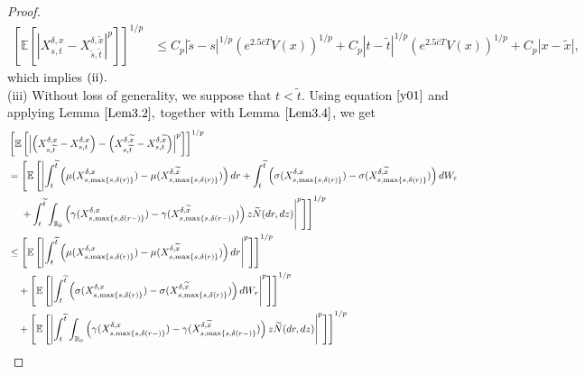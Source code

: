 \documentclass[11pt]{article}
\theoremstyle{theorem}
\theoremstyle{definition}
\newcommand{\bR}{\mathbb{R}}
\newcommand{\1}{{\bf 1}}
\begin{document}
\begin{proof}
\begin{align*}
\left[\mathbb{E}\left[\left|X^{\delta, x}_{s,t}-X^{\delta, \widetilde{x}}_{\widetilde{s}, \widetilde{t}}\right|^p\right]\right]^{1/p} 
& \leq 
 C_p |\widetilde{s} -s|^{1/p} (e^{2.5\overline{c}T}V(x))^{1/p}  + C_p | t -  \widetilde{t} |^{1/p}  (e^{2.5\overline{c}T}V(x))^{1/p}   + C_p |x-\widetilde{x}|,
\end{align*}
which implies $\textup{(ii)}.$\\
(iii) 
Without loss of generality, we suppose that $t<\widetilde{t}.$ Using equation $\eqref{y01}$ and applying Lemma $\ref{Lem3.2},$ together with Lemma $\ref{Lem3.4}$, we get
\begin{align*}
   & \left[\mathbb{E}\left[\left|\left(X^{\delta, x}_{s,\widetilde{t}}-X^{\delta,x}_{s,t}\right) - \left(X^{\delta, \widetilde{x}}_{s,\widetilde{t}}-X^{\delta, \widetilde{x}}_{s,t}\right)\right|^p\right]\right]^{1/p} \notag\\
  & =  \left[\mathbb{E} \left[\left| \int_t^{\widetilde{t} } \left ( \mu(X_{s,\max\{s,\delta(r)\}}^{\delta,x}) -\mu(X_{s,\max\{s,\delta(r)\}}^{\delta,\widetilde{x}}) \right) dr + \int_t^{\widetilde{t}} \left ( \sigma(X_{s,\max\{s,\delta(r)\}}^{\delta,x}) -\sigma(X_{s,\max\{s,\delta(r)\}}^{\delta,\widetilde{x}}) \right) dW_r \right. \right. \right.  \notag\\
  & \quad  \left. \left. \left. + \int_t^{\widetilde{t}} \int_{\bR_0} \left (\gamma (X_{s,\max\{s,\delta(r-)\}}^{\delta,x})-\gamma (X_{s,\max\{s,\delta(r-)\}}^{\delta,\widetilde{x}})\right) z \widetilde{N}(dr, dz) \right|^p\right] \right]^{1/p}   \notag\\
  & \leq  \left[\mathbb{E} \left[\left| \int_t^{\widetilde{t} } \left( \mu(X_{s,\max\{s,\delta(r)\}}^{\delta,x}) -\mu(X_{s,\max\{s,\delta(r)\}}^{\delta,\widetilde{x}}) \right) dr \right|^p\right] \right]^{1/p}  \notag\\
  & \quad + \left[\mathbb{E} \left[\left| \int_t^{\widetilde{t} } \left( \sigma(X_{s,\max\{s,\delta(r)\}}^{\delta,x}) -\sigma(X_{s,\max\{s,\delta(r)\}}^{\delta,\widetilde{x}})\right) dW_r \right|^p\right] \right]^{1/p}  \notag\\
   & \quad + \left[\mathbb{E} \left[\left| \int_t^{\widetilde{t}} \int_{\bR_0} \left(\gamma (X_{s,\max\{s,\delta(r-)\}}^{\delta,x})-\gamma (X_{s,\max\{s,\delta(r-)\}}^{\delta,\widetilde{x}})\right) z \widetilde{N}(dr, dz) \right|^p\right] \right]^{1/p}  \notag\\

\end{align*}
\end{proof}
\end{document}
